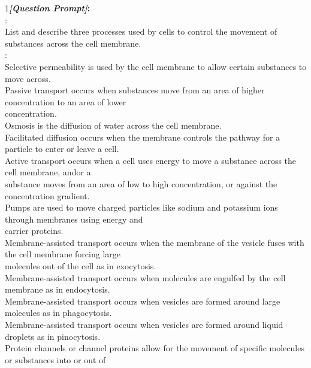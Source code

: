 \begin{figure*}
\begin{tcolorbox}[
    colback=gray!10,      %
    colframe=gray!80,     %
    title=Case Study 5,
    fonttitle=\bfseries,  %
    rounded corners,
    boxrule=0.5mm,        %
    width=\linewidth
]
\scriptsize
\textcircled{\raisebox{-0.3pt} {\scriptsize1}}\textbf{\emph{[Question Prompt]}:}\\
\text{[Question]}: \\
List and describe three processes used by cells to control the movement of substances across the cell membrane.\\
:\\
Selective permeability is used by the cell membrane to allow certain substances to move across.\\
Passive transport occurs when substances move from an area of higher concentration to an area of lower\\
concentration.\\
Osmosis is the diffusion of water across the cell membrane.\\
Facilitated diffusion occurs when the membrane controls the pathway for a particle to enter or leave a cell.\\
Active transport occurs when a cell uses energy to move a substance across the cell membrane, and\/or a\\
substance moves from an area of low to high concentration, or against the concentration gradient.\\
Pumps are used to move charged particles like sodium and potassium ions through membranes using energy and\\
carrier proteins.\\
Membrane-assisted transport occurs when the membrane of the vesicle fuses with the cell membrane forcing large\\
molecules out of the cell as in exocytosis.\\
Membrane-assisted transport occurs when molecules are engulfed by the cell membrane as in endocytosis.\\
Membrane-assisted transport occurs when vesicles are formed around large molecules as in phagocytosis.\\
Membrane-assisted transport occurs when vesicles are formed around liquid droplets as in pinocytosis.\\
Protein channels or channel proteins allow for the movement of specific molecules or substances into or out of\\

\end{tcolorbox}
\end{figure*}
